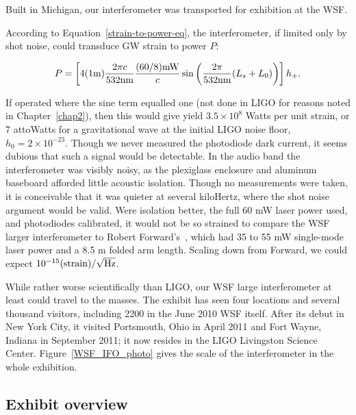 Built in Michigan, our interferometer was transported for exhibition at the WSF.

According to Equation~\ref{strain-to-power-eq}, the interferometer, if limited only by shot noise, could transduce GW strain to power $P$:

\begin{equation}
P = \left[ 4 (1 \textup{m}) \frac{2\pi c}{532 \textup{nm}} \frac{(60/8) \textup{mW}}{c} \sin \left(\frac{2\pi}{532 \textup{nm}} (L_s+L_0) \right) \right] h_+.
\end{equation}

\noindent If operated where the sine term equalled one (not done in LIGO for reasons noted in Chapter~\ref{chap2}), then this would give yield $3.5\times 10^8$ Watts per unit strain, or 7 attoWatts for a gravitational wave at the initial LIGO noise floor, $h_0 = 2\times 10^{-23}$.
Though we never measured the photodiode dark current, it seems dubious that such a signal would be detectable.
In the audio band the interferometer was visibly noisy, as the plexiglass enclosure and aluminum baseboard afforded little acoustic isolation.
Though no measurements were taken, it is conceivable that it was quieter at several kiloHertz, where the shot noise argument would be valid.
Were isolation better, the full 60 mW laser power used, and photodiodes calibrated, it would not be so strained to compare the WSF larger interferometer to Robert Forward's~\cite{Forward1978}, which had 35 to 55 mW single-mode laser power and a 8.5 m folded arm length.
Scaling down from Forward, we could expect $10^{-15} \textup{(strain)}/\sqrt{\textup{Hz}}$.



While rather worse scientifically than LIGO, our WSF large interferometer at least could travel to the masses.
The exhibit has seen four locations and several thousand visitors, including 2200 in the June 2010 WSF itself.
After its debut in New York City, it visited Portsmouth, Ohio in April 2011 and Fort Wayne, Indiana in September 2011; it now resides in the LIGO Livingston Science Center.
Figure~\ref{WSF_IFO_photo} gives the scale of the interferometer in the whole exhibition.

        \subsection{Exhibit overview}
        \label{exhibit_overview}

